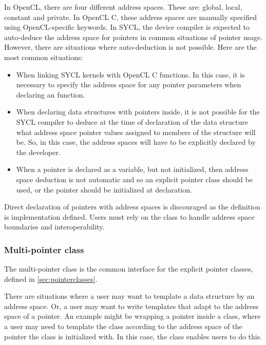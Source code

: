In OpenCL, there are four different address spaces. These are: global,
local, constant and private.  In OpenCL C, these address spaces are
manually specified using OpenCL-specific keywords. In SYCL, the device
compiler is expected to auto-deduce the address space for pointers in
common situations of pointer usage. However, there are situations
where auto-deduction is not possible. Here are the most common
situations:
\begin{itemize}
  \item
    When linking SYCL kernels with OpenCL C functions. In this case,
    it is necessary to specify the address space for any pointer
    parameters when declaring an  function.

  \item
    When declaring data structures with pointers inside, it is not
    possible for the SYCL compiler to deduce at the time of
    declaration of the data structure what address space pointer
    values assigned to members of the structure will be. So, in this
    case, the address spaces will have to be explicitly declared by
    the developer.

  \item
    When a pointer is declared as a variable, but not initialized,
    then address space deduction is not automatic and so an explicit
    pointer class should be used, or the pointer should be initialized
    at declaration.
\end{itemize}

Direct declaration of pointers with address spaces is discouraged as the
definition is implementation defined. Users must rely on the
 class to handle address space boundaries and
interoperability.


\subsubsection{Multi-pointer class}
\label{sec:multiptr}
The multi-pointer class is the common interface for the explicit pointer
classes, defined in \ref{sec:pointerclasses}.

There are situations where a user may want to template a data structure by an
address space. Or, a user may want to write templates that adapt to the address
space of a pointer. An example might be wrapping a pointer inside a class, where
a user may need to template the class according to the address space of the
pointer the class is initialized with. In this case, the 
class enables users to do this.

